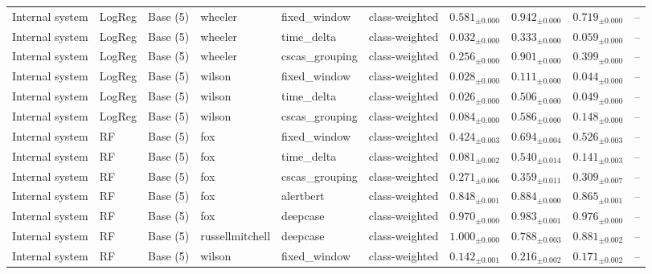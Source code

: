 \begin{longtable}{llllllcccc}
\addlinespace
Internal system & LogReg & Base (5) & wheeler & fixed\_window & class-weighted & $0.581_{\pm 0.000}$ & $0.942_{\pm 0.000}$ & $0.719_{\pm 0.000}$ & -- \\
\addlinespace
Internal system & LogReg & Base (5) & wheeler & time\_delta & class-weighted & $0.032_{\pm 0.000}$ & $0.333_{\pm 0.000}$ & $0.059_{\pm 0.000}$ & -- \\
\addlinespace
Internal system & LogReg & Base (5) & wheeler & cscas\_grouping & class-weighted & $0.256_{\pm 0.000}$ & $0.901_{\pm 0.000}$ & $0.399_{\pm 0.000}$ & -- \\
\addlinespace
Internal system & LogReg & Base (5) & wilson & fixed\_window & class-weighted & $0.028_{\pm 0.000}$ & $0.111_{\pm 0.000}$ & $0.044_{\pm 0.000}$ & -- \\
\addlinespace
Internal system & LogReg & Base (5) & wilson & time\_delta & class-weighted & $0.026_{\pm 0.000}$ & $0.506_{\pm 0.000}$ & $0.049_{\pm 0.000}$ & -- \\
\addlinespace
Internal system & LogReg & Base (5) & wilson & cscas\_grouping & class-weighted & $0.084_{\pm 0.000}$ & $0.586_{\pm 0.000}$ & $0.148_{\pm 0.000}$ & -- \\
\addlinespace
Internal system & RF & Base (5) & fox & fixed\_window & class-weighted & $0.424_{\pm 0.003}$ & $0.694_{\pm 0.004}$ & $0.526_{\pm 0.003}$ & -- \\
\addlinespace
Internal system & RF & Base (5) & fox & time\_delta & class-weighted & $0.081_{\pm 0.002}$ & $0.540_{\pm 0.014}$ & $0.141_{\pm 0.003}$ & -- \\
\addlinespace
Internal system & RF & Base (5) & fox & cscas\_grouping & class-weighted & $0.271_{\pm 0.006}$ & $0.359_{\pm 0.011}$ & $0.309_{\pm 0.007}$ & -- \\
\addlinespace
Internal system & RF & Base (5) & fox & alertbert & class-weighted & $0.848_{\pm 0.001}$ & $0.884_{\pm 0.000}$ & $0.865_{\pm 0.001}$ & -- \\
\addlinespace
Internal system & RF & Base (5) & fox & deepcase & class-weighted & $0.970_{\pm 0.000}$ & $0.983_{\pm 0.001}$ & $0.976_{\pm 0.000}$ & -- \\
\addlinespace
Internal system & RF & Base (5) & russellmitchell & deepcase & class-weighted & $1.000_{\pm 0.000}$ & $0.788_{\pm 0.003}$ & $0.881_{\pm 0.002}$ & -- \\
\addlinespace
Internal system & RF & Base (5) & wilson & fixed\_window & class-weighted & $0.142_{\pm 0.001}$ & $0.216_{\pm 0.002}$ & $0.171_{\pm 0.002}$ & -- \\

\end{longtable}
